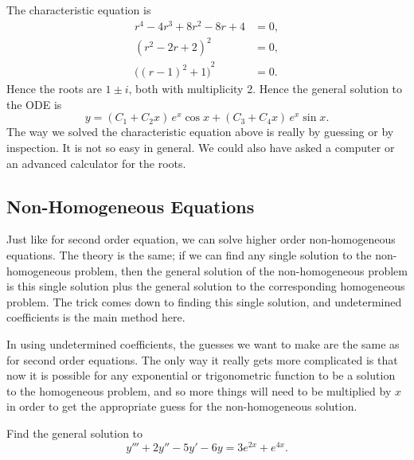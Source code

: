 \documentclass{ximera}
\begin{document}
\begin{exampleSol}
    The characteristic equation is
    \begin{align*}
        r^4 - 4 r^3 + 8 r^2 - 8 r + 4 & = 0 , \\
        {(r^2-2r+2)}^2 & = 0 , \\
        {\bigl({(r-1)}^2+1\bigr)}^2 & = 0 .
    \end{align*}
    Hence the roots are $1 \pm i$, both with multiplicity 2.  Hence the general solution to the ODE is
    \begin{equation*}
    y = ( C_1 + C_2 x ) \, e^{x} \cos x + ( C_3 + C_4 x ) \, e^{x} \sin x .
    \end{equation*}
    The way we solved the characteristic equation above is really by guessing or by inspection.  It is not so easy in general.  We could also have asked a computer or an advanced calculator for the roots.
\end{exampleSol}


\subsection{Non-Homogeneous Equations}

Just like for second order equation, we can solve higher order non-homogeneous equations. The theory is the same; if we can find any single solution to the non-homogeneous problem, then the general solution of the non-homogeneous problem is this single solution plus the general solution to the corresponding homogeneous problem. The trick comes down to finding this single solution, and undetermined coefficients is the main method here.

In using undetermined coefficients, the guesses we want to make are the same as for second order equations. The only way it really gets more complicated is that now it is possible for any exponential or trigonometric function to be a solution to the homogeneous problem, and so more things will need to be multiplied by $x$ in order to get the appropriate guess for the non-homogeneous solution.

\begin{example}
    Find the general solution to 
    \[ 
        y''' + 2y'' - 5y' - 6y = 3e^{2x} + e^{4x}.
    \]
\end{example}
\end{document}
